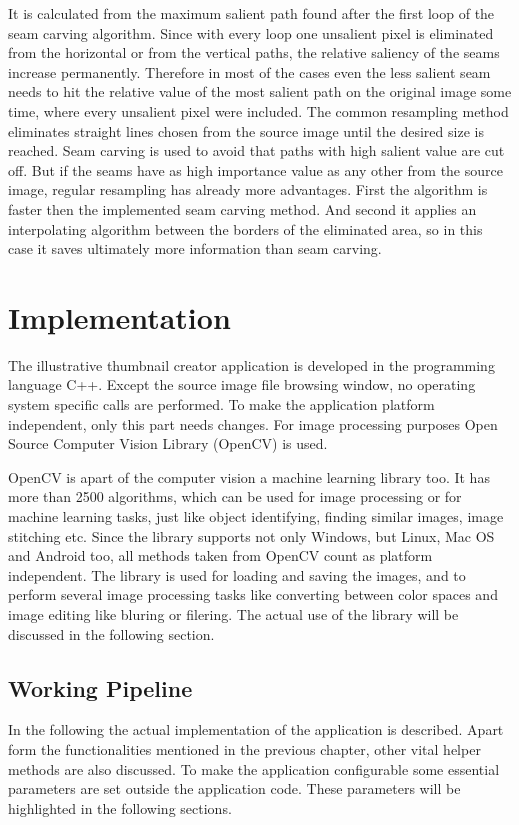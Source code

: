 \documentclass[draft,final]{vutinfth} %
\begin{document}
	It is calculated from the maximum salient path found after the first loop of the seam carving algorithm.
	Since with every loop one unsalient pixel is eliminated from the horizontal or from the vertical paths, the relative saliency of the seams increase permanently.
	Therefore in most of the cases even the less salient seam needs to hit the relative value of the most salient path on the original image some time, where every unsalient pixel were included. 
	The common resampling method eliminates straight lines chosen from the source image until the desired size is reached.
	Seam carving is used to avoid that paths with high salient value are cut off.
	But if the seams have as high importance value as any other from the source image, regular resampling has already more advantages.
	First the algorithm is faster then the implemented seam carving method.
	And second it applies an interpolating algorithm between the borders of the eliminated area, so in this case it saves ultimately more information than seam carving.   
	
	\chapter{Implementation}
	The illustrative thumbnail creator application is developed in the programming language C++.
	Except the source image file browsing window, no operating system specific calls are performed.
	To make the application platform independent, only this part needs changes.
	For image processing purposes Open Source Computer Vision Library (OpenCV) is used.\par 
	OpenCV is apart of the computer vision a machine learning library too.     
	It has more than 2500 algorithms, which can be used for image processing or for machine learning tasks, just like object identifying, finding similar images, image stitching etc.
	Since the library supports not only Windows, but Linux, Mac OS and Android too, all methods taken from OpenCV count as platform independent.
	The library is used for loading and saving the images, and to perform several image processing tasks like converting between color spaces and image editing like bluring or filering.
	The actual use of the library will be discussed in the following section.
	
	\section{Working Pipeline}
	In the following the actual implementation of the application is described.
	Apart form the functionalities mentioned in the previous chapter, other vital helper methods are also discussed.
	To make the application configurable some essential parameters are set outside the application code. These parameters will be highlighted in the following sections.
	
\end{document}
